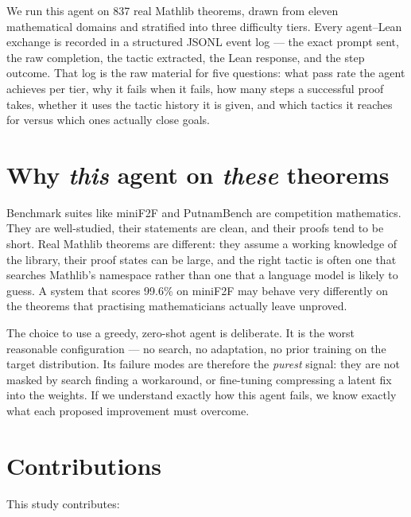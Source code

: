 We run this agent on 837 real Mathlib theorems, drawn from eleven mathematical domains
and stratified into three difficulty tiers.
Every agent--Lean exchange is recorded in a structured JSONL event log ---
the exact prompt sent, the raw completion, the tactic extracted, the Lean response,
and the step outcome.
That log is the raw material for five questions: what pass rate the agent achieves
per tier, why it fails when it fails, how many steps a successful proof takes,
whether it uses the tactic history it is given, and which tactics it reaches for
versus which ones actually close goals.

\section{Why \emph{this} agent on \emph{these} theorems}

Benchmark suites like miniF2F and PutnamBench are competition mathematics.
They are well-studied, their statements are clean, and their proofs tend to be short.
Real Mathlib theorems are different: they assume a working knowledge of the library,
their proof states can be large, and the right tactic is often one that searches
Mathlib's namespace rather than one that a language model is likely to guess.
A system that scores 99.6\% on miniF2F may behave very differently on the theorems
that practising mathematicians actually leave unproved.

The choice to use a greedy, zero-shot agent is deliberate.
It is the worst reasonable configuration --- no search, no adaptation, no prior training
on the target distribution.
Its failure modes are therefore the \emph{purest} signal: they are not masked by search
finding a workaround, or fine-tuning compressing a latent fix into the weights.
If we understand exactly how this agent fails, we know exactly what each proposed
improvement must overcome.

\section{Contributions}

This study contributes:

